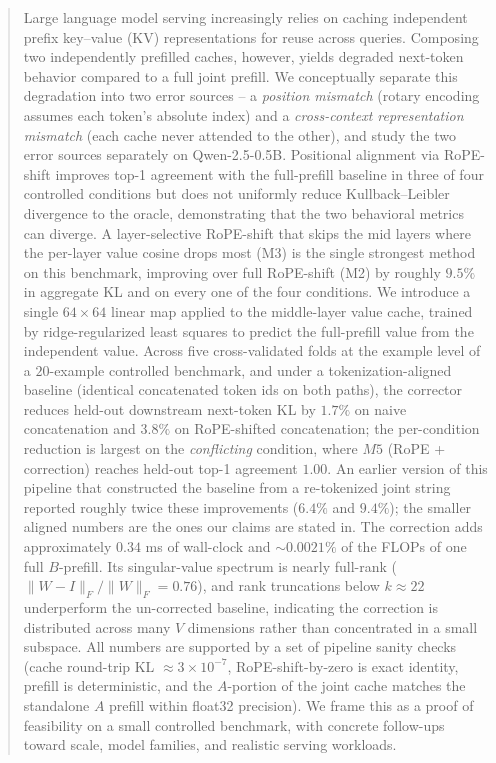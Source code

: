 \begin{abstract}
Large language model serving increasingly relies on caching independent prefix key--value (KV) representations for reuse across queries. Composing two independently prefilled caches, however, yields degraded next-token behavior compared to a full joint prefill. We conceptually separate this degradation into two error sources -- a \emph{position mismatch} (rotary encoding assumes each token's absolute index) and a \emph{cross-context representation mismatch} (each cache never attended to the other), and study the two error sources separately on Qwen-2.5-0.5B. Positional alignment via RoPE-shift improves top-1 agreement with the full-prefill baseline in three of four controlled conditions but does not uniformly reduce Kullback--Leibler divergence to the oracle, demonstrating that the two behavioral metrics can diverge. A layer-selective RoPE-shift that skips the mid layers where the per-layer value cosine drops most (M3) is the single strongest method on this benchmark, improving over full RoPE-shift (M2) by roughly $9.5\%$ in aggregate KL and on every one of the four conditions. We introduce a single $64\times64$ linear map applied to the middle-layer value cache, trained by ridge-regularized least squares to predict the full-prefill value from the independent value. Across five cross-validated folds at the example level of a $20$-example controlled benchmark, and under a tokenization-aligned baseline (identical concatenated token ids on both paths), the corrector reduces held-out downstream next-token KL by $1.7\%$ on naive concatenation and $3.8\%$ on RoPE-shifted concatenation; the per-condition reduction is largest on the \emph{conflicting} condition, where $M5$ (RoPE + correction) reaches held-out top-1 agreement $1.00$. An earlier version of this pipeline that constructed the baseline from a re-tokenized joint string reported roughly twice these improvements ($6.4\%$ and $9.4\%$); the smaller aligned numbers are the ones our claims are stated in. The correction adds approximately $0.34$ ms of wall-clock and $\sim 0.0021\%$ of the FLOPs of one full $B$-prefill. Its singular-value spectrum is nearly full-rank ($\lVert W - I \rVert_F / \lVert W \rVert_F = 0.76$), and rank truncations below $k \approx 22$ underperform the un-corrected baseline, indicating the correction is distributed across many $V$ dimensions rather than concentrated in a small subspace. All numbers are supported by a set of pipeline sanity checks (cache round-trip KL $\approx 3\times10^{-7}$, RoPE-shift-by-zero is exact identity, prefill is deterministic, and the $A$-portion of the joint cache matches the standalone $A$ prefill within float32 precision). We frame this as a proof of feasibility on a small controlled benchmark, with concrete follow-ups toward scale, model families, and realistic serving workloads.
\end{abstract}

